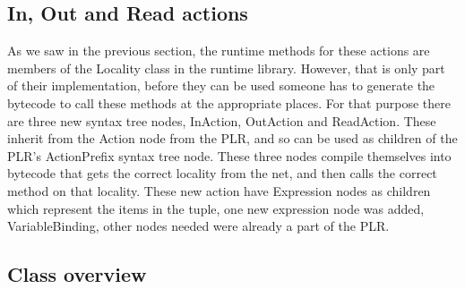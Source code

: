 	\subsection{In, Out and Read actions}
	
	As we saw in the previous section, the runtime methods for these actions are 
	members of the \textsf{Locality} class in the runtime library. However, that 
	is only part of their implementation, before they can be used someone has to 
	generate the bytecode to call these methods at the appropriate places. For 
	that purpose there are three new syntax tree nodes, \textsf{InAction}, 
	\textsf{OutAction} and \textsf{ReadAction}. These inherit from the 
	\textsf{Action} node from the PLR, and so can be used as children of the 
	PLR's \textsf{ActionPrefix} syntax tree node. These three nodes compile 
	themselves into bytecode that gets the correct locality from the net, and 
	then calls the correct method on that locality. These new action have 
	\textsf{Expression} nodes as children which represent the items in the 
	tuple, one new expression node was added, \textsf{VariableBinding}, other 
	nodes needed were already a part of the PLR.
	
\subsection{Class overview}
	
